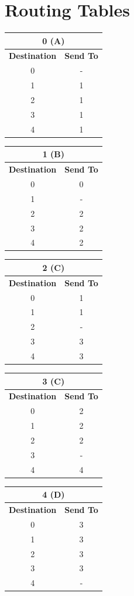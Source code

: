 \documentclass[12pt]{article}
\begin{document}
\section*{Routing Tables}
\begin{center}
\begin{tabular}{|cc|}
\hline
\multicolumn{2}{|c|}{\textbf{0 (A)}}\\
\hline
\textbf{Destination} & \textbf{Send To}\\
0 & - \\
1 & 1 \\
2 & 1 \\
3 & 1 \\
4 & 1 \\
\hline
\end{tabular}
\bigskip
\begin{tabular}{|cc|}
\hline
\multicolumn{2}{|c|}{\textbf{1 (B)}}\\
\hline
\textbf{Destination} & \textbf{Send To}\\
0 & 0 \\
1 & - \\
2 & 2 \\
3 & 2 \\
4 & 2 \\
\hline
\end{tabular}
\bigskip
\begin{tabular}{|cc|}
\hline
\multicolumn{2}{|c|}{\textbf{2 (C)}}\\
\hline
\textbf{Destination} & \textbf{Send To}\\
0 & 1 \\
1 & 1 \\
2 & - \\
3 & 3 \\
4 & 3 \\
\hline
\end{tabular}

\begin{tabular}{|cc|}
\hline
\multicolumn{2}{|c|}{\textbf{3 (C)}}\\
\hline
\textbf{Destination} & \textbf{Send To}\\
0 & 2 \\
1 & 2 \\
2 & 2 \\
3 & - \\
4 & 4 \\
\hline
\end{tabular}
\bigskip
\begin{tabular}{|cc|}
\hline
\multicolumn{2}{|c|}{\textbf{4 (D)}}\\
\hline
\textbf{Destination} & \textbf{Send To}\\
0 & 3 \\
1 & 3 \\
2 & 3 \\
3 & 3 \\
4 & - \\
\hline
\end{tabular}\\
\end{center}
\end{document}
